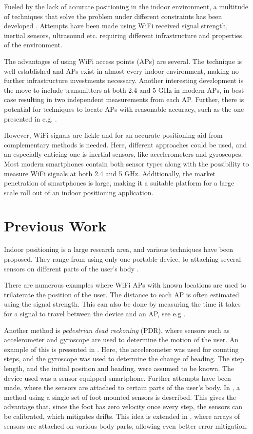 \documentclass{LTHthesis}
\begin{document}
Fueled by the lack of accurate positioning in the indoor environment, a multitude of techniques that solve the problem under different constraints has been developed \cite{positioning_overview}. Attempts have been made using WiFi received signal strength, inertial sensors, ultrasound etc. requiring different infrastructure and properties of the environment. 

The advantages of using WiFi access points (APs) are several. The technique is well established and APs exist in almost every indoor environment, making no further infrastructure investments necessary. Another interesting development is the move to include transmitters at both 2.4 and 5 GHz in modern APs, in best case resulting in two independent measurements from each AP. Further, there is potential for techniques to locate APs with reasonable accuracy, such as the one presented in e.g. \cite{exjobb}. 

However, WiFi signals are fickle and for an accurate positioning aid from complementary methods is needed. Here, different approaches could be used, and an especially enticing one is inertial sensors, like accelerometers and gyroscopes. Most modern smartphones contain both sensor types along with the possibility to measure WiFi signals at both 2.4 and 5 GHz. Additionally, the market penetration of smartphones is large, making it a suitable platform for a large scale roll out of an indoor positioning application.
%

\section{Previous Work}
Indoor positioning is a large research area, and various techniques have been proposed. They range from using only one portable device, to attaching several sensors on different parts of the user's body \cite{body_mounted}.

There are numerous examples where WiFi APs with known locations are used to trilaterate the position of the user. The distance to each AP is often estimated using the signal strength. This can also be done by measuring the time it takes for a signal to travel between the device and an AP, see e.g \cite{wlan_pos}.

Another method is \emph{pedestrian dead reckoning} (PDR), where sensors such as accelerometer and gyroscope are used to determine the motion of the user. An example of this is presented in \cite{exjobb}. Here, the accelerometer was used for counting steps, and the gyroscope was used to determine the change of heading. The step length, and the initial position and heading, were assumed to be known. The device used was a sensor equipped smartphone. Further attempts have been made, where the sensors are attached to certain parts of the user's body. In \cite{foot_mounted}, a method using a single set of foot mounted sensors is described. This gives the advantage that, since the foot has zero velocity once every step, the sensors can be calibrated, which mitigates drifts. This idea is extended in \cite{body_mounted}, where arrays of sensors are attached on various body parts, allowing even better error mitigation.
\end{document}
